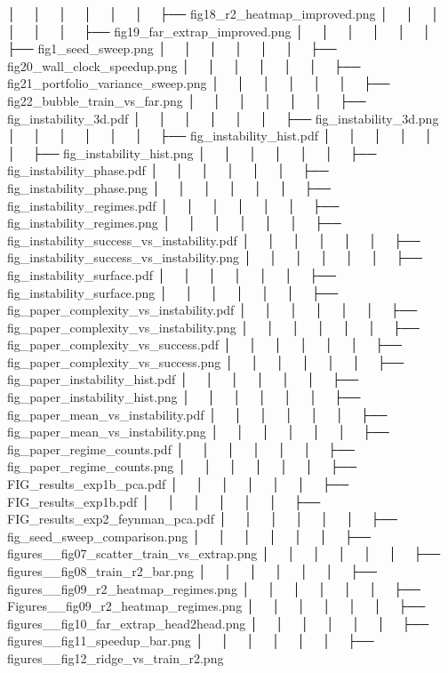 │   │       │   │       │   │   ├── fig18_r2_heatmap_improved.png
│   │       │   │       │   │   ├── fig19_far_extrap_improved.png
│   │       │   │       │   │   ├── fig1_seed_sweep.png
│   │       │   │       │   │   ├── fig20_wall_clock_speedup.png
│   │       │   │       │   │   ├── fig21_portfolio_variance_sweep.png
│   │       │   │       │   │   ├── fig22_bubble_train_vs_far.png
│   │       │   │       │   │   ├── fig_instability_3d.pdf
│   │       │   │       │   │   ├── fig_instability_3d.png
│   │       │   │       │   │   ├── fig_instability_hist.pdf
│   │       │   │       │   │   ├── fig_instability_hist.png
│   │       │   │       │   │   ├── fig_instability_phase.pdf
│   │       │   │       │   │   ├── fig_instability_phase.png
│   │       │   │       │   │   ├── fig_instability_regimes.pdf
│   │       │   │       │   │   ├── fig_instability_regimes.png
│   │       │   │       │   │   ├── fig_instability_success_vs_instability.pdf
│   │       │   │       │   │   ├── fig_instability_success_vs_instability.png
│   │       │   │       │   │   ├── fig_instability_surface.pdf
│   │       │   │       │   │   ├── fig_instability_surface.png
│   │       │   │       │   │   ├── fig_paper_complexity_vs_instability.pdf
│   │       │   │       │   │   ├── fig_paper_complexity_vs_instability.png
│   │       │   │       │   │   ├── fig_paper_complexity_vs_success.pdf
│   │       │   │       │   │   ├── fig_paper_complexity_vs_success.png
│   │       │   │       │   │   ├── fig_paper_instability_hist.pdf
│   │       │   │       │   │   ├── fig_paper_instability_hist.png
│   │       │   │       │   │   ├── fig_paper_mean_vs_instability.pdf
│   │       │   │       │   │   ├── fig_paper_mean_vs_instability.png
│   │       │   │       │   │   ├── fig_paper_regime_counts.pdf
│   │       │   │       │   │   ├── fig_paper_regime_counts.png
│   │       │   │       │   │   ├── FIG_results_exp1b_pca.pdf
│   │       │   │       │   │   ├── FIG_results_exp1b.pdf
│   │       │   │       │   │   ├── FIG_results_exp2_feynman_pca.pdf
│   │       │   │       │   │   ├── fig_seed_sweep_comparison.png
│   │       │   │       │   │   ├── figures__fig07_scatter_train_vs_extrap.png
│   │       │   │       │   │   ├── figures__fig08_train_r2_bar.png
│   │       │   │       │   │   ├── figures__fig09_r2_heatmap_regimes.png
│   │       │   │       │   │   ├── Figures__fig09_r2_heatmap_regimes.png
│   │       │   │       │   │   ├── figures__fig10_far_extrap_head2head.png
│   │       │   │       │   │   ├── figures__fig11_speedup_bar.png
│   │       │   │       │   │   ├── figures__fig12_ridge_vs_train_r2.png
